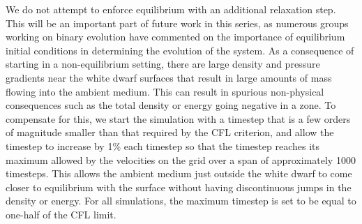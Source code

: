 \documentclass[iop]{../emulateapj}
\begin{document}
We do not attempt to enforce equilibrium with an additional relaxation
step. This will be an important part of future work in this series, as
numerous groups working on binary evolution
\citep{swc:2000,motl:2002,rosswog:2004,dan:2011,pakmor:2012:gadget}
have commented on the importance of equilibrium initial conditions in
determining the evolution of the system. As a consequence of starting 
in a non-equilibrium setting, there are 
large density and pressure gradients near the white dwarf surfaces
that result in large amounts of mass flowing into the ambient
medium. This can result in spurious non-physical consequences such as 
the total density or energy going negative in a zone. To compensate 
for this, we start the simulation with a timestep that is a few orders 
of magnitude smaller than that required by the CFL criterion, and allow
the timestep to increase by 1\% each timestep so that the timestep reaches 
its maximum allowed by the velocities on the grid over a span of approximately 
1000 timesteps. This allows the ambient medium just outside the white dwarf
to come closer to equilibrium with the surface without having 
discontinuous jumps in the density or energy. For all simulations, 
the maximum timestep is set to be equal to one-half of the CFL limit.
\end{document}
